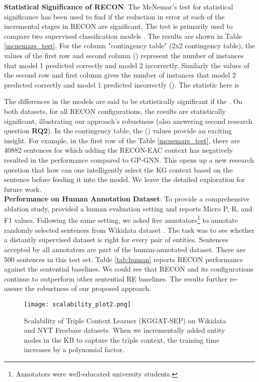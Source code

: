 \documentclass[sigconf]{acmart}
\begin{document}
\textbf{Statistical Significance of RECON}: The McNemar's test for statistical significance has been used to find if the reduction in error at each of the incremental stages in RECON are significant. The test is primarily used to compare two supervised classification models \cite{dietterich1998approximate}. The results are shown in Table \ref{mcnemars_test}.
For the column "contingency table" (2x2 contingency table), the values of the first row and second column () represent the number of instances that model 1 predicted correctly and model 2 incorrectly. Similarly the values of the second row and first column gives the number of instances that model 2 predicted correctly and model 1 predicted incorrectly (). The statistic here is 

The differences in the models are said to be statistically significant if the  \cite{dietterich1998approximate}. On both datasets, for all RECON configurations, the results are statistically significant, illustrating our approach's robustness (also answering second research question \textbf{RQ2}). In the contingency table, the () values provide an exciting insight. For example, in the first row of the Table \ref{mcnemars_test}, there are 40882 sentences for which adding the RECON-EAC context has negatively resulted in the performance compared to GP-GNN. This opens up a new research question that how can one intelligently select the KG context based on the sentence before feeding it into the model. We leave the detailed exploration for future work. \\
\textbf{Performance on Human Annotation Dataset}: To provide a comprehensive ablation study, \cite{DBLP:conf/acl/ZhuLLFCS19} provided a human evaluation setting and reports Micro P, R, and F1 values. Following the same setting, we asked five annotators\footnote{Annotators were well-educated university students.} to annotate randomly selected sentences from Wikidata dataset \cite{DBLP:conf/emnlp/SorokinG17}. The task was to see whether a distantly supervised dataset is right for every pair of entities. Sentences accepted by all annotators are part of the human-annotated dataset. There are 500 sentences in this test set. Table \ref{tab:human} reports RECON performance against the sentential baselines. We could see that RECON and its configurations continue to outperform other sentential RE baselines. The results further re-assure the robustness of our proposed approach. 

\begin{figure}[h!]
  \texttt{[image: scalability\_plot2.png]}
  \caption{Scalability of Triple Context Learner (KGGAT-SEP) on Wikidata and NYT Freebase datasets. When we incrementally added entity nodes in the KB to capture the triple context, the training time increases by a polynomial factor.} 
  \label{fig:scale}
\end{figure}
\end{document}
